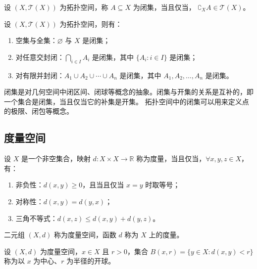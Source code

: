 \vspace{1em}

\begin{definition}
    设 $ (X,\mathcal{T}(X)) $ 为拓扑空间，称 $ A\subseteq X $ 为闭集，当且仅当， $ \complement_X A \in \mathcal{T}(X) $。
\end{definition}
\vspace{1em}

\begin{proposition}[闭集的性质]
    设 $ (X,\mathcal{T}(X)) $ 为拓扑空间，则有：
    \begin{enumerate}
        \item 空集与全集：$ \varnothing $ 与 $ X $ 是闭集；
        \item 对任意交封闭：$ \bigcap_{i\in I} A_i $ 是闭集，其中 $ \{A_i:i\in I\}$ 是闭集；
        \item 对有限并封闭：$ A_1\cup A_2\cup \cdots \cup A_n $ 是闭集，其中 $ A_1,A_2,\ldots,A_n $ 是闭集。
    \end{enumerate}
\end{proposition}

\begin{note}
    闭集是对几何空间中闭区间、闭球等概念的抽象。闭集与开集的关系是互补的，即一个集合是闭集，当且仅当它的补集是开集。
    拓扑空间中的闭集可以用来定义点的极限、闭包等概念。
\end{note}

\vspace{1em}

\subsection{度量空间}
\begin{definition}
    设 $ X $ 是一个非空集合，映射 $ d:X\times X\to \mathbb{R} $ 称为度量，当且仅当，$ \forall x,y,z\in X $，有：
    \begin{enumerate}
        \item 非负性：$ d(x,y)\geq 0 $，且当且仅当 $ x=y $ 时取等号；
        \item 对称性：$ d(x,y)=d(y,x) $；
        \item 三角不等式：$ d(x,z)\leq d(x,y)+d(y,z) $。
    \end{enumerate}
    二元组 $ (X,d) $ 称为度量空间，函数 $ d $ 称为 $ X $ 上的度量。
\end{definition}
\vspace{1em}

\begin{definition}
    设 $ (X,d) $ 为度量空间，$ x\in X $ 且 $ r>0 $，集合 $ B(x,r)=\{y\in X:d(x,y)<r\} $ 称为以 $ x $ 为中心、$ r $ 为半径的开球。
\end{definition}
\vspace{1em}

